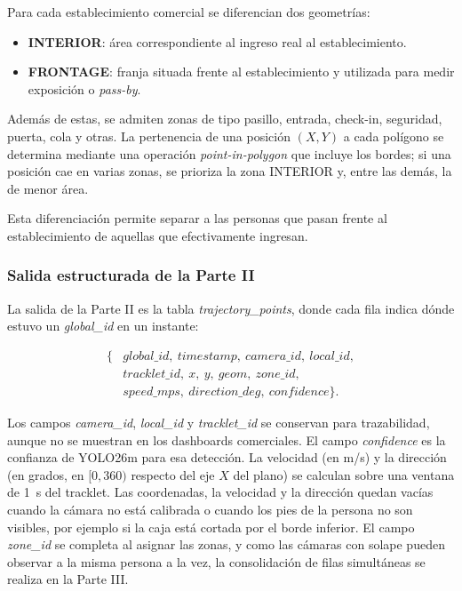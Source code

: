 \documentclass[12pt,a4paper]{article}
\begin{document}
Para cada establecimiento comercial se diferencian dos geometrías:

\begin{itemize}
\item \textbf{INTERIOR}: área correspondiente al ingreso real al
establecimiento.

\item \textbf{FRONTAGE}: franja situada frente al establecimiento y
utilizada para medir exposición o \textit{pass-by}.
\end{itemize}

Además de estas, se admiten zonas de tipo pasillo, entrada, check-in,
seguridad, puerta, cola y otras. La pertenencia de una posición $(X,Y)$
a cada polígono se determina mediante una operación
\textit{point-in-polygon} que incluye los bordes; si una posición cae en
varias zonas, se prioriza la zona INTERIOR y, entre las demás, la de
menor área.

Esta diferenciación permite separar a las personas que pasan frente al
establecimiento de aquellas que efectivamente ingresan.

\subsubsection{Salida estructurada de la Parte II}

La salida de la Parte II es la tabla \textit{trajectory\_points}, donde
cada fila indica dónde estuvo un \textit{global\_id} en un instante:

\begin{equation}
\begin{aligned}
\{&
global\_id,\ timestamp,\ camera\_id,\ local\_id,\\
&tracklet\_id,\ x,\ y,\ geom,\ zone\_id,\\
&speed\_mps,\ direction\_deg,\ confidence
\}.
\end{aligned}
\end{equation}

Los campos \textit{camera\_id}, \textit{local\_id} y
\textit{tracklet\_id} se conservan para trazabilidad, aunque no se
muestran en los dashboards comerciales. El campo \textit{confidence} es
la confianza de YOLO26m para esa detección. La velocidad (en m/s) y la
dirección (en grados, en $[0,360)$ respecto del eje $X$ del plano) se
calculan sobre una ventana de 1~s del tracklet. Las coordenadas, la
velocidad y la dirección quedan vacías cuando la cámara no está
calibrada o cuando los pies de la persona no son visibles, por ejemplo
si la caja está cortada por el borde inferior. El campo \textit{zone\_id}
se completa al asignar las zonas, y como las cámaras con solape pueden
observar a la misma persona a la vez, la consolidación de filas
simultáneas se realiza en la Parte III.
\end{document}
